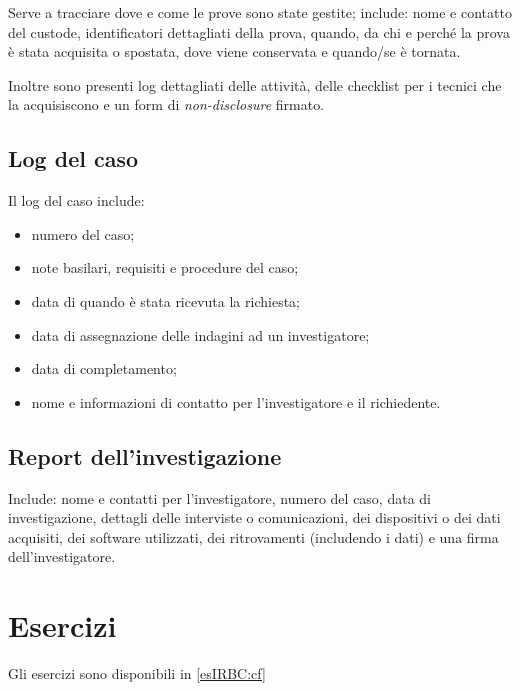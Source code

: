 Serve a tracciare dove e come le prove sono state gestite; include:
nome e contatto del custode, identificatori dettagliati della prova, quando, 
da chi e perché la prova è stata acquisita o spostata, dove viene conservata 
e quando/se è tornata.

Inoltre sono presenti log dettagliati delle attività, delle checklist per i 
tecnici che la acquisiscono e un form di \textit{non-disclosure} firmato.

\subsection{Log del caso}

Il log del caso include:
\begin{itemize}
\item numero del caso;
\item note basilari, requisiti e procedure del caso;
\item data di quando è stata ricevuta la richiesta;
\item data di assegnazione delle indagini ad un investigatore;
\item data di completamento;
\item nome e informazioni di contatto per l'investigatore e il richiedente.
\end{itemize}

\subsection{Report dell'investigazione}

Include: nome e contatti per l'investigatore, numero del caso, data di 
investigazione, dettagli delle interviste o comunicazioni, dei 
dispositivi o dei dati acquisiti, dei software utilizzati, dei ritrovamenti 
(includendo i dati) e una firma dell'investigatore.

\section{Esercizi}

Gli esercizi sono disponibili in \ref{esIRBC:cf}
